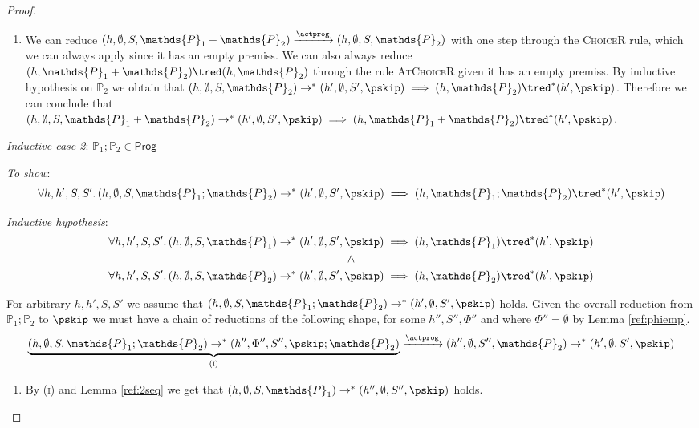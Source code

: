 \begin{thm}
{\begin{proof}
\begin{enumerate}
	\item We can reduce $(h, \emptyset, S, \mathds{P}_1 + \mathds{P}_2) \xrightarrow{\actprog} (h, \emptyset, S, \mathds{P}_2)$ with one step through the \textsc{ChoiceR} rule, which we can always apply since it has an empty premiss. We can also always reduce $(h, \mathds{P}_1 + \mathds{P}_2) \tred (h, \mathds{P}_2)$ through the rule \textsc{AtChoiceR} given it has an empty premiss. By inductive hypothesis on $\mathds{P}_2$ we obtain that $(h, \emptyset, S, \mathds{P}_2) \rightarrow^* (h', \emptyset, S', \pskip) \implies (h, \mathds{P}_2) \tred^* (h', \pskip)$. Therefore we can conclude that $(h, \emptyset, S, \mathds{P}_1 + \mathds{P}_2) \rightarrow^* (h', \emptyset, S', \pskip) \implies  (h, \mathds{P}_1 + \mathds{P}_2) \tred^* (h', \pskip)$. \\
\end{enumerate}

\textit{Inductive case 2}: $\mathds{P}_1 ; \mathds{P}_2 \in \mathsf{Prog}$

\textit{To show}:
\[
	\forall h, h', S, S' \ldotp
	(h, \emptyset, S, \mathds{P}_1 ; \mathds{P}_2) \rightarrow^* (h', \emptyset, S', \pskip) \implies 
	(h, \mathds{P}_1 ; \mathds{P}_2 ) \tred^* (h', \pskip)
\]

\textit{Inductive hypothesis}:
\begin{gather*}
	\forall h, h', S, S' \ldotp
	(h, \emptyset, S, \mathds{P}_1) \rightarrow^* (h', \emptyset, S', \pskip) \implies 
	(h, \mathds{P}_1) \tred^* (h', \pskip)
	\\ \land \\
	\forall h, h', S, S' \ldotp
	(h, \emptyset, S, \mathds{P}_2) \rightarrow^* (h', \emptyset, S', \pskip) \implies 
	(h, \mathds{P}_2) \tred^* (h', \pskip)
\end{gather*}

For arbitrary $h, h', S, S'$ we assume that $(h, \emptyset, S, \mathds{P}_1 ; \mathds{P}_2) \rightarrow^* (h', \emptyset, S', \pskip)$ holds. Given the overall reduction from $\mathds{P}_1 ; \mathds{P}_2$ to $\pskip$ we must have a chain of reductions of the following shape, for some $h'', S'', \Phi''$ and where $\Phi'' = \emptyset$ by Lemma \ref{ref:phiemp}.
\[
	\underbrace{(h, \emptyset, S, \mathds{P}_1 ; \mathds{P}_2) \rightarrow^* (h'', \Phi'', S'', \pskip; \mathds{P}_2)}_{(\textsc{i})}
	\xrightarrow{\actprog} (h'', \emptyset, S'', \mathds{P}_2) \rightarrow^* (h', \emptyset, S', \pskip)
\]
\begin{enumerate}
	\item \label{seq:1} By (\textsc{i}) and Lemma \ref{ref:2seq} we get that $(h, \emptyset, S, \mathds{P}_1) \rightarrow^* (h'', \emptyset, S'', \pskip)$ holds.
	

\end{enumerate}
\end{proof}}
\end{thm}
